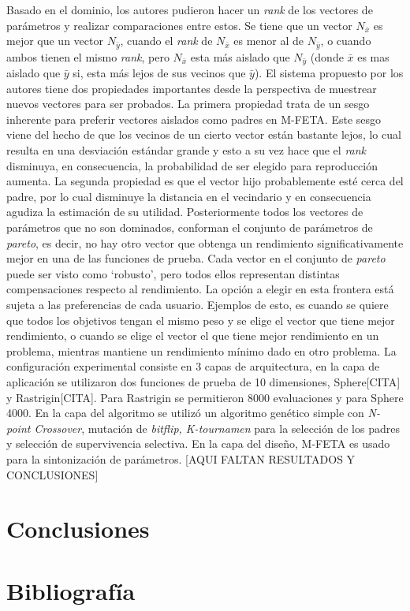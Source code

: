 \documentclass[letter, 10pt]{article}
\begin{document}
\begin{multicols}{2}
Basado en el dominio, los autores pudieron hacer un \textit{rank} de los vectores de parámetros y realizar comparaciones entre estos. Se tiene que un vector $N_{\bar{x}}$ es mejor que un vector $N_{\bar{y}}$, cuando el \textit{rank} de $N_{\bar{x}}$ es menor al de $N_{\bar{y}}$, o cuando ambos tienen el mismo \textit{rank}, pero $N_{\bar{x}}$ esta más aislado que $N_{\bar{y}}$ (donde $\bar{x}$ es mas aislado que $\bar{y}$ si, esta más lejos de sus vecinos que $\bar{y}$). El sistema propuesto por los autores tiene dos propiedades importantes desde la perspectiva de muestrear nuevos vectores para ser probados. La primera propiedad trata de un sesgo inherente para preferir vectores aislados como padres en M-FETA. Este sesgo viene del hecho de que los vecinos de un cierto vector están bastante lejos, lo cual resulta en una desviación estándar grande y esto a su vez hace que el \textit{rank} disminuya, en consecuencia, la probabilidad de ser elegido para reproducción aumenta. La segunda propiedad es que el vector hijo probablemente esté cerca del padre, por lo cual disminuye la distancia en el vecindario y en consecuencia agudiza la estimación de su utilidad. Posteriormente todos los vectores de parámetros que no son dominados, conforman el conjunto de parámetros de \textit{pareto}, es decir, no hay otro vector que obtenga un rendimiento significativamente mejor en una de las funciones de prueba. Cada vector en el conjunto de \textit{pareto} puede ser visto como `robusto', pero todos ellos representan distintas compensaciones respecto al rendimiento. La opción a elegir en esta frontera está sujeta a las preferencias de cada usuario. Ejemplos de esto, es cuando se quiere que todos los objetivos tengan el mismo peso y se elige el vector que tiene mejor rendimiento, o cuando se elige el vector el que tiene mejor rendimiento en un problema, mientras mantiene un rendimiento mínimo dado en otro problema. La configuración experimental consiste en 3 capas de arquitectura, en la capa de aplicación se utilizaron dos funciones de prueba de 10 dimensiones, Sphere[CITA] y Rastrigin[CITA]. Para Rastrigin se permitieron 8000 evaluaciones y para Sphere 4000. En la capa del algoritmo se utilizó un algoritmo genético simple con \textit{N-point Crossover}, mutación de \textit{bitflip, K-tournamen} para la selección de los padres y selección de supervivencia selectiva. En la capa del diseño, M-FETA es usado para la sintonización de parámetros. [AQUI FALTAN RESULTADOS Y CONCLUSIONES]

\section{Conclusiones}

 
\section{Bibliograf\'ia}




\end{multicols}
\end{document}
